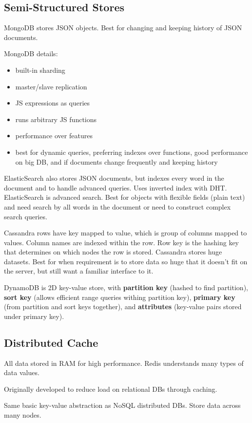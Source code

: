 \documentclass[11pt]{article}
\begin{document}
\subsection{Semi-Structured Stores}
\label{sec:org4f9c01f}
MongoDB stores JSON objects.
Best for changing and keeping history of JSON documents.

MongoDB details:
\begin{itemize}
\item built-in sharding
\item master/slave replication
\item JS expressions as queries
\item runs arbitrary JS functions
\item performance over features
\item best for dynamic queries, preferring indexes over functions, good performance on big DB, and if
documents change frequently and keeping history
\end{itemize}

ElasticSearch also stores JSON documents, but indexes every word in the document and to handle
advanced queries.
Uses inverted index with DHT.
ElasticSearch is advanced search.
Best for objects with flexible fields (plain text) and need search by all words in the document
or need to construct complex search queries.

Cassandra rows have key mapped to value, which is group of columns mapped to values.
Column names are indexed within the row.
Row key is the hashing key that determines on which nodes the row is stored.
Cassandra stores huge datasets.
Best for when requirement is to store data so huge that it doesn't fit on the server, but still want a
familiar interface to it.

DynamoDB is 2D key-value store, with \textbf{partition key} (hashed to find partition), \textbf{sort key} (allows
efficient range queries withing partition key), \textbf{primary key} (from partition and sort keys together),
and \textbf{attributes} (key-value pairs stored under primary key).
\subsection{Distributed Cache}
\label{sec:orge6f217b}
All data stored in RAM for high performance.
Redis understands many types of data values.

Originally developed to reduce load on relational DBs through caching.

Same basic key-value abstraction as NoSQL distributed DBs.
Store data across many nodes.
\end{document}
